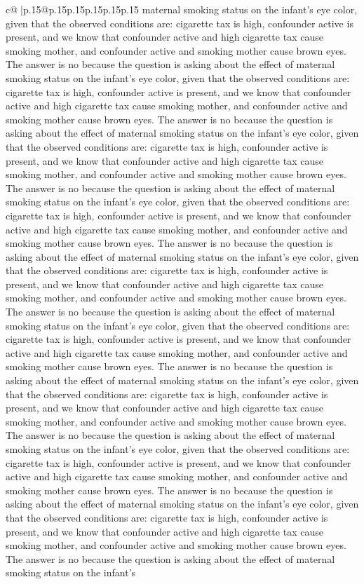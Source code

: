 \documentclass{article}
\begin{document}
{\begin{supertabular}{c@{$\;$}|p{.15\linewidth}@{}p{.15\linewidth}p{.15\linewidth}p{.15\linewidth}p{.15\linewidth}p{.15\linewidth}}
{{{maternal smoking status on the infant's eye color, given that the observed conditions are: cigarette tax is high, confounder active is present, and we know that confounder active and high cigarette tax cause smoking mother, and confounder active and smoking mother cause brown eyes. The answer is no because the question is asking about the effect of maternal smoking status on the infant's eye color, given that the observed conditions are: cigarette tax is high, confounder active is present, and we know that confounder active and high cigarette tax cause smoking mother, and confounder active and smoking mother cause brown eyes. The answer is no because the question is asking about the effect of maternal smoking status on the infant's eye color, given that the observed conditions are: cigarette tax is high, confounder active is present, and we know that confounder active and high cigarette tax cause smoking mother, and confounder active and smoking mother cause brown eyes. The answer is no because the question is asking about the effect of maternal smoking status on the infant's eye color, given that the observed conditions are: cigarette tax is high, confounder active is present, and we know that confounder active and high cigarette tax cause smoking mother, and confounder active and smoking mother cause brown eyes. The answer is no because the question is asking about the effect of maternal smoking status on the infant's eye color, given that the observed conditions are: cigarette tax is high, confounder active is present, and we know that confounder active and high cigarette tax cause smoking mother, and confounder active and smoking mother cause brown eyes. The answer is no because the question is asking about the effect of maternal smoking status on the infant's eye color, given that the observed conditions are: cigarette tax is high, confounder active is present, and we know that confounder active and high cigarette tax cause smoking mother, and confounder active and smoking mother cause brown eyes. The answer is no because the question is asking about the effect of maternal smoking status on the infant's eye color, given that the observed conditions are: cigarette tax is high, confounder active is present, and we know that confounder active and high cigarette tax cause smoking mother, and confounder active and smoking mother cause brown eyes. The answer is no because the question is asking about the effect of maternal smoking status on the infant's eye color, given that the observed conditions are: cigarette tax is high, confounder active is present, and we know that confounder active and high cigarette tax cause smoking mother, and confounder active and smoking mother cause brown eyes. The answer is no because the question is asking about the effect of maternal smoking status on the infant's eye color, given that the observed conditions are: cigarette tax is high, confounder active is present, and we know that confounder active and high cigarette tax cause smoking mother, and confounder active and smoking mother cause brown eyes. The answer is no because the question is asking about the effect of maternal smoking status on the infant's }}}
\end{supertabular}}
\end{document}
